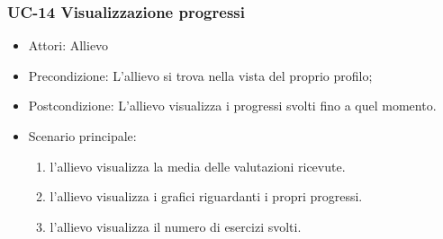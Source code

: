 	\subsubsection{UC-14 Visualizzazione progressi}
	\begin{itemize}
			\item Attori: Allievo
			\item Precondizione: L'allievo si trova nella vista del proprio profilo;
			\item Postcondizione: L'allievo visualizza i progressi svolti fino a quel momento.
			\item Scenario principale:
				\begin{enumerate}
					\item l'allievo visualizza la media delle valutazioni ricevute.
					\item l'allievo visualizza i grafici riguardanti i propri progressi.
					\item l'allievo visualizza il numero di esercizi svolti.
				\end{enumerate}
	\end{itemize}
			


